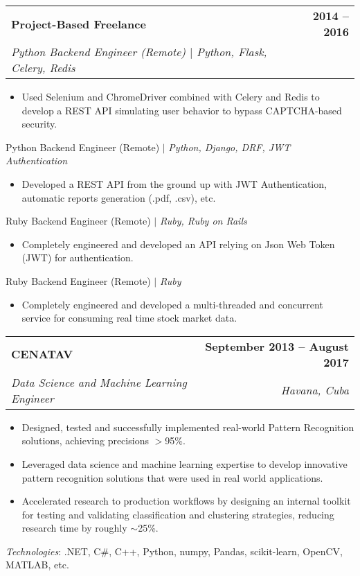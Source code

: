 \documentclass[letterpaper,11pt]{article}
\makeatletter
\newcommand{\resumeItem}[1]{
  \item\small{
    {#1 \vspace{-2pt}}
  }
}
\newcommand{\resumeSubheading}[4]{
  \vspace{-2pt}\item
    \begin{tabular*}{1.0\textwidth}[t]{l@{\extracolsep{\fill}}r}
      \textbf{#1} & \textbf{\small #2} \\
      \textit{\small#3} & \textit{\small #4} \\
    \end{tabular*}\vspace{-7pt}
}
\newcommand{\resumeItemListStart}{\begin{itemize}}
\newcommand{\resumeItemListEnd}{\end{itemize}\vspace{-5pt}}
\makeatother
\begin{document}
    \resumeSubheading
      {Project-Based Freelance}{2014 -- 2016}
      {Python Backend Engineer (Remote) $|$ \emph{Python, Flask, Celery, Redis}}{}
      \resumeItemListStart
        \resumeItem{Used Selenium and ChromeDriver combined with Celery and Redis to develop a REST API simulating user behavior to bypass CAPTCHA-based security.}
      \resumeItemListEnd

      {Python Backend Engineer (Remote) $|$ \emph{Python, Django, DRF, JWT Authentication}}{}
      \vspace{-8pt}
      \resumeItemListStart
        \resumeItem{Developed a REST API from the ground up with JWT Authentication, automatic reports generation (.pdf, .csv), etc.}
      \resumeItemListEnd

      {Ruby Backend Engineer (Remote) $|$ \emph{Ruby, Ruby on Rails}}{}
      \vspace{-8pt}
      \resumeItemListStart
        \resumeItem{Completely engineered and developed an API relying on Json Web Token (JWT) for authentication.}
      \resumeItemListEnd

      {Ruby Backend Engineer (Remote) $|$ \emph{Ruby}}{}
      \vspace{-8pt}
      \resumeItemListStart
        \resumeItem{Completely engineered and developed a multi-threaded and concurrent service for consuming real time stock market data.}
      \resumeItemListEnd

      \resumeSubheading
      {CENATAV}{September 2013 -- August 2017}
      {Data Science and Machine Learning Engineer}{Havana, Cuba}
      \resumeItemListStart
        \resumeItem{Designed, tested and successfully implemented real-world Pattern Recognition solutions, achieving precisions $>$95\%.}
        \resumeItem{Leveraged data science and machine learning expertise to develop innovative pattern recognition solutions that were used in real world applications.}
        \resumeItem{Accelerated research to production workflows by designing an internal toolkit for testing and validating classification and clustering strategies, reducing research time by roughly $\sim$25\%.}
      \resumeItemListEnd
    \begin{itemize}[leftmargin=0.0in, label={}]
      \small{
        \item{
          \emph{Technologies}{: .NET, C\#, C++, Python, numpy, Pandas, scikit-learn, OpenCV, MATLAB, etc.} \\
        }
      }
    \end{itemize}
\end{document}
